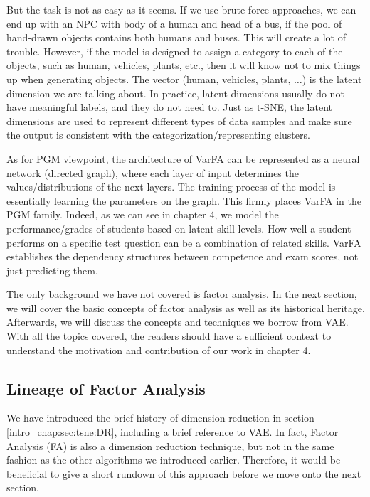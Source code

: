 But the task is not as easy as it seems. If we use brute force approaches, we
can end up with an NPC with body of a human and head of a bus, if the pool of
hand-drawn objects contains both humans and buses. This will create a lot of
trouble. However, if the model is designed to assign a category to each of the
objects, such as human, vehicles, plants, etc., then it will know not to mix
things up when generating objects. The vector (human, vehicles, plants,
$\dots$) is the latent dimension we are talking about. In practice, latent
dimensions usually do not have meaningful labels, and they do not need to. Just
as t-SNE, the latent dimensions are used to represent different types of data
samples and make sure the output is consistent with the
categorization/representing clusters.

As for PGM viewpoint, the architecture of VarFA can be represented as a neural
network (directed graph), where each layer of input determines the
values/distributions of the next layers. The training process of the model is
essentially learning the parameters on the graph. This firmly places VarFA in
the PGM family. Indeed, as we can see in chapter 4, we model the
performance/grades of students based on latent skill levels. How well a student
performs on a specific test question can be a combination of related skills.
VarFA establishes the dependency structures between competence and exam scores,
not just predicting them.

The only background we have not covered is factor analysis. In the next
section, we will cover the basic concepts of factor analysis as well as its
historical heritage. Afterwards, we will discuss the concepts and techniques we
borrow from VAE. With all the topics covered, the readers should have a
sufficient context to understand the motivation and contribution of our work in
chapter 4.
\subsection{Lineage of Factor Analysis}
We have introduced the brief history of dimension reduction in section
\ref{intro_chap:sec:tsne:DR}, including a brief reference to VAE. In fact,
Factor Analysis (FA) is also a dimension reduction technique, but not in the
same fashion as the other algorithms we introduced earlier. Therefore, it would
be beneficial to give a short rundown of this approach before we move onto the
next section.

